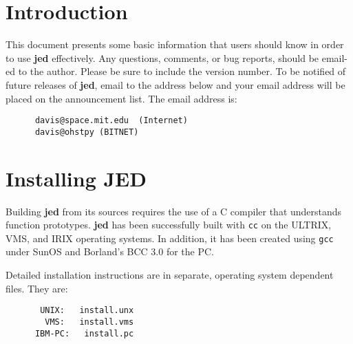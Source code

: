 \setlength{\oddsidemargin}{0mm}
\setlength{\evensidemargin}{0mm}
\setlength{\textwidth}{160mm}
\setlength{\topmargin}{-10mm}
\setlength{\textheight}{210mm}
\parindent=0mm
\parskip=5mm

\def\mytitle{The JED Editor}

\newlength{\pagewidth}
\setlength{\pagewidth}{\textwidth}

\makeatletter
\def\ps@headings{\def\@oddfoot{}%
\def\@oddhead{\makebox[\textwidth][l]{\underline{\hbox to \pagewidth{\bf
\mytitle\hfill\thepage}}}}%
\def\@evenfoot{}%
\def\@evenhead{\makebox[\textwidth][l]{\underline{\hbox to \pagewidth{\bf
\mytitle\hfill\thepage}}}}}%
\pagestyle{headings}

\newcommand{\slang}{{\bf S-Lang}}
\newcommand{\jed}{{\bf jed}}
\newcommand{\exmp}[1]{{\tt #1}}
\newcommand{\var}[1]{{\tt #1}}
\newcommand{\key}[1]{{\sc #1}}


\tableofcontents
\pagebreak

\section{Introduction}

 This document presents some basic information that users should know in
 order to use \jed{} effectively.  Any questions, comments, or bug reports,
 should be email-ed to the author. Please be sure to include the version
 number.  To be notified of future releases of \jed{}, email to the address
 below and your email address will be placed on the announcement list. The
 email address is:
\begin{verbatim}
      davis@space.mit.edu  (Internet)
      davis@ohstpy (BITNET)
\end{verbatim}

\section{Installing JED}

 Building \jed{} from its sources requires the use of a C compiler that
 understands function prototypes.  \jed{} has been successfully built with
 \verb|cc| on the ULTRIX, VMS, and IRIX operating systems.  In addition, it
 has been created using \verb|gcc| under SunOS and Borland's BCC 3.0 for the
 PC.

 Detailed installation instructions are in separate, operating system
 dependent files.  They are:
\begin{verbatim}
       UNIX:   install.unx
        VMS:   install.vms
      IBM-PC:   install.pc
\end{verbatim}

